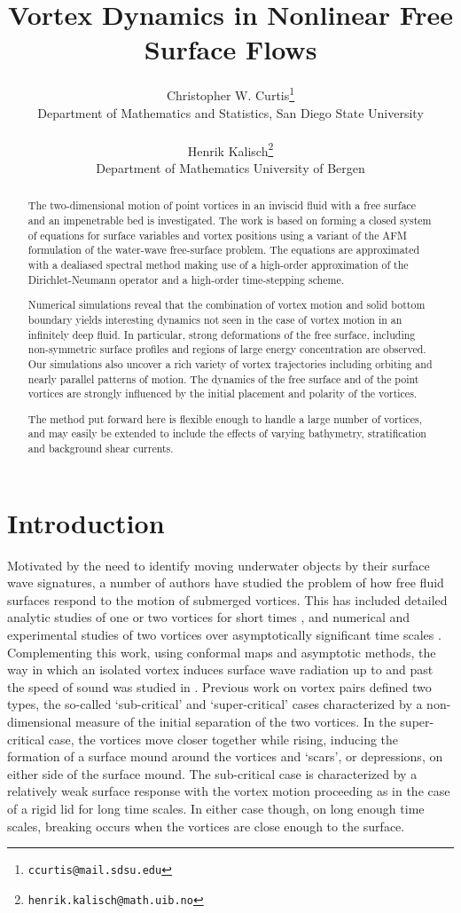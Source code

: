 \documentclass[a4paper,11pt]{article}
\title{Vortex Dynamics in Nonlinear Free Surface Flows}
\author{Christopher W. Curtis\footnote{\texttt{ccurtis@mail.sdsu.edu}} \\
{\small Department of Mathematics and Statistics, San Diego State University} 
\\\\
Henrik Kalisch\footnote{\texttt{henrik.kalisch@math.uib.no}}
\\ {\small Department of Mathematics University of Bergen} 
}
\date{}
\begin{document}
\maketitle

\begin{abstract}
The two-dimensional motion of point vortices in an inviscid fluid with a free surface and an impenetrable bed is investigated.  The work is based on forming a closed system of equations for surface variables and vortex positions using a variant of the AFM formulation \cite{afm} of the water-wave free-surface problem.  The equations are approximated with a dealiased spectral method making use of a high-order approximation of the Dirichlet-Neumann operator and a high-order time-stepping scheme. 

Numerical simulations reveal that the combination of vortex motion and solid bottom boundary yields interesting dynamics not seen in the case of vortex motion in an infinitely deep fluid.  In particular, strong deformations of the free surface,
including non-symmetric surface profiles and regions of large energy concentration are observed.  Our simulations also uncover a rich variety of vortex trajectories including
orbiting and nearly parallel patterns of motion.  The dynamics of the free surface and of the point vortices are strongly influenced by the initial placement and polarity of the vortices.

The method put forward here is flexible enough to handle a large number of vortices,
and may easily be extended to include the effects of varying bathymetry, 
stratification and background shear currents.
\end{abstract}


\section{Introduction}
Motivated by the need to identify moving underwater objects by their surface wave signatures, a number of authors have studied the problem of how free fluid surfaces respond to the motion of submerged vortices.  This has included detailed analytic studies of one or two vortices for short times \cite{tyvand1,tyvand2}, and numerical and experimental studies of two vortices over asymptotically significant time scales \cite{fish,marcus,telste,tryggvason}.  Complementing this work, using conformal maps and asymptotic methods, the way in which an isolated vortex induces surface wave radiation up to and past the speed of sound was studied  in \cite{ruban}.  Previous work on vortex pairs defined two types, the so-called `sub-critical' and `super-critical' cases characterized by a non-dimensional measure of the initial separation of the two vortices.  In the super-critical case, the vortices move closer together while rising, inducing the formation of a surface mound around the vortices and `scars', or depressions, on either side of the surface mound.  The sub-critical case is characterized by a relatively weak surface response with the vortex motion proceeding as in the case of a rigid lid for long time scales.  In either case though, on long enough time scales, breaking occurs when the vortices are close enough to the surface.  
\end{document}
